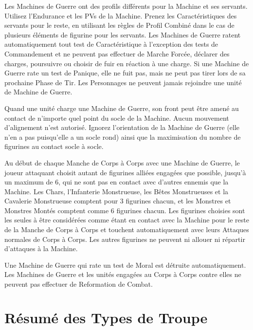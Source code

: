 Les Machines de Guerre ont des profils différents pour la Machine et ses servants. Utilisez l'Endurance et les PVs de la Machine. Prenez les Caractéristiques des servants pour le reste, en utilisant les règles de Profil Combiné dans le cas de plusieurs éléments de figurine pour les servants. Les Machines de Guerre ratent automatiquement tout test de Caractéristique à l'exception des tests de Commandement et ne peuvent pas effectuer de Marche Forcée, déclarer des charges, poursuivre ou choisir de fuir en réaction à une charge. Si une Machine de Guerre rate un test de Panique, elle ne fuit pas, mais ne peut pas tirer lors de sa prochaine Phase de Tir. Les Personnages ne peuvent jamais rejoindre une unité de Machine de Guerre.

Quand une unité charge une Machine de Guerre, son front peut être amené au contact de n'importe quel point du socle de la Machine. Aucun mouvement d'alignement n'est autorisé. Ignorez l'orientation de la Machine de Guerre (elle n'en a pas puisqu'elle a un socle rond) ainsi que la maximisation du nombre de figurines au contact socle à socle.

Au début de chaque Manche de Corps à Corps avec une Machine de Guerre, le joueur attaquant choisit autant de figurines alliées engagées que possible, jusqu'à un maximum de 6, qui ne sont pas en contact avec d'autres ennemis que la Machine. Les Chars, l'Infanterie Monstrueuse, les Bêtes Monstrueuses et la Cavalerie Monstrueuse comptent pour 3 figurines chacun, et les Monstres et Monstres Montés comptent comme 6 figurines chacun. Les figurines choisies sont les seules à être considérées comme étant en contact avec la Machine pour le reste de la Manche de Corps à Corps et touchent automatiquement avec leurs Attaques normales de Corps à Corps. Les autres figurines ne peuvent ni allouer ni répartir d'attaques à la Machine.

Une Machine de Guerre qui rate un test de Moral est détruite automatiquement. Les Machines de Guerre et les unités engagées au Corps à Corps contre elles ne peuvent pas effectuer de Reformation de Combat.

\newpage
\section*{Résumé des Types de Troupe}


